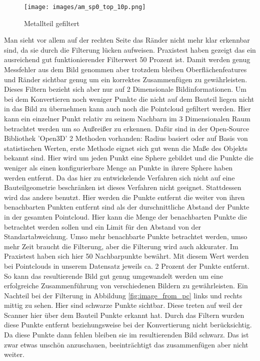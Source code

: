 \documentclass[../main.tex]{subfiles}
\begin{document}
\begin{figure}
    \centering
    \texttt{[image: images/am\_sp0\_top\_10p.png]}
    \caption{Metallteil gefiltert}\label{fig:metall_image}
\end{figure}

Man sieht vor allem auf der rechten Seite das Ränder nicht mehr klar erkennbar sind, 
da sie durch die Filterung lücken aufweisen. Praxistest haben gezeigt das ein 
ausreichend gut funktionierender Filterwert 50 Prozent ist. Damit werden genug 
Messfehler aus dem Bild genommen aber trotzdem bleiben Oberflächenfeatures und Ränder
sichtbar genug um ein korrektes Zusammenfügen zu gewährleisten.
Dieses Filtern bezieht sich aber nur auf 2 Dimensionale Bildinformationen.
Um bei dem Konvertieren noch weniger Punkte die nicht auf dem Bauteil liegen nicht
in das Bild zu übernehmen kann auch noch die Pointcloud gefiltert werden.
Hier kann ein einzelner Punkt relativ zu seinem Nachbarn im 3 Dimensionalen Raum 
betrachtet werden um so Außreißer zu erkennen. Dafür sind in der Open-Source
Bibliothek 'Open3D' 2 Methoden vorhanden: Radius basiert oder auf Basis von 
statistischen Werten, erste Methode eignet sich gut wenn die Maße des Objekts bekannt
sind. Hier wird um jeden Punkt eine Sphere gebildet und die Punkte die weniger als 
einen konfigurierbare Menge an Punkte in ihrere Sphere haben werden entfernt. Da 
das hier zu entwickelende Verfahren sich nicht auf eine Bauteilgeometrie beschränken
ist dieses Verfahren nicht geeignet. Stattdessen wird das andere benutzt. Hier werden
die Punkte entfernt die weiter von ihren benachbarten Punkten entfernt sind als der 
durschnittliche Abstand der Punkte in der gesamten Pointcloud. Hier kann die Menge der 
benachbarten Punkte die betrachtet werden sollen und ein Limit für den Abstand von der 
Standartabweichung. Umso mehr benachbarte Punkte betrachtet werden, umso mehr Zeit 
braucht die Filterung, aber die Filterung wird auch akkurater. Im Praxistest haben sich
hier 50 Nachbarpunkte bewährt. Mit diesem Wert werden bei Pointclouds in unserem 
Datensatz jeweils ca. 2 Prozent der Punkte entfernt. So kann das resultierende Bild 
gut genug umgewandelt werden um eine erfolgreiche Zusammenführung von verschiedenen 
Bildern zu gewährleisten.
Ein Nachteil bei der Filterung in Abbildung \ref{fig:image_from_pc} links und rechts 
mittig zu sehen. Hier sind schwarze Punkte sichtbar. Diese treten auf weil der Scanner
hier über dem Bauteil Punkte erkannt hat. Durch das Filtern wurden diese Punkte entfernt
beziehungsweise bei der Konvertierung nicht berücksichtig. Da diese Punkte dann fehlen
bleiben sie im resultierenden Bild schwarz. Das ist zwar etwas unschön anzuschauen, 
beeinträchtigt das zusammenfügen aber nicht weiter. 
\end{document}
